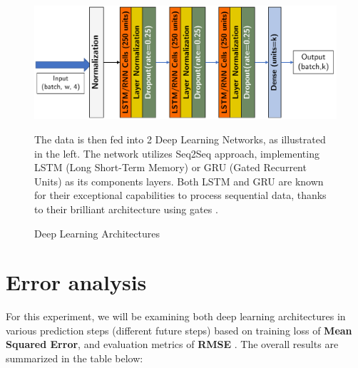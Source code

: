 \documentclass[11pt]{article}
\begin{document}
\begin{figure}[ht]
    \begin{minipage}{0.6\linewidth}
        \begin{adjustbox}{left}
            \includegraphics[width=\textwidth]{plots/architecture.pdf}
            
        \end{adjustbox}
    \end{minipage}
    \begin{minipage}{0.4\linewidth}
       The data is then fed into 2 Deep Learning Networks, as illustrated in the left. The network utilizes Seq2Seq approach, implementing LSTM (Long Short-Term Memory) or GRU (Gated Recurrent Units) as its components layers. Both LSTM and GRU are known for their exceptional capabilities to process sequential data, thanks to their brilliant architecture using gates \cite{Sak-LSTM, Chung-GRU}.  
    \end{minipage}
        \caption{Deep Learning Architectures}
    
    \label{fig:architecture}
\end{figure}

\section{Error analysis}

For this experiment, we will be examining both deep learning architectures in various prediction steps (different future steps) based on training loss of \textbf{Mean Squared Error}, and evaluation metrics of \textbf{RMSE} . The overall results are summarized in the table below:  
\end{document}
